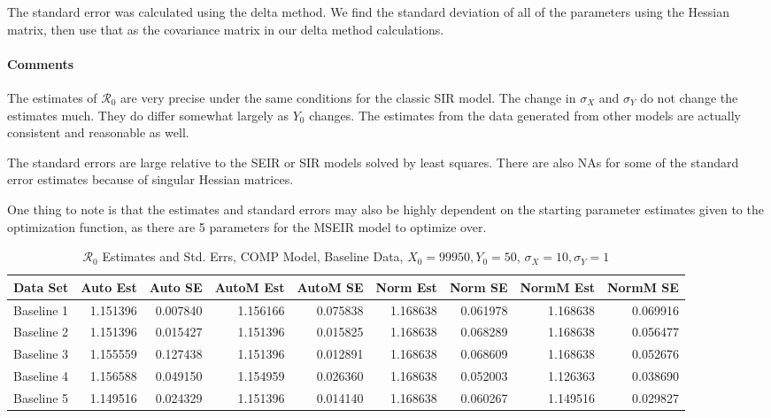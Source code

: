 \documentclass[12pt]{article}
\newcommand{\rr}{\ensuremath{\mathcal{R}_0}}
\begin{document}
The standard error was calculated using the delta method. We find the standard deviation of all of the parameters using the Hessian matrix, then use that as the covariance matrix in our delta method calculations.

\paragraph{Comments}

The estimates of $\rr$ are very precise under the same conditions for the classic SIR model. The change in $\sigma_X$ and $\sigma_Y$ do not change the estimates much. They do differ somewhat largely as $Y_0$ changes. The estimates from the data generated from other models are actually consistent and reasonable as well.

The standard errors are large relative to the SEIR or SIR models solved by least squares. There are also NAs for some of the standard error estimates because of singular Hessian matrices.

One thing to note is that the estimates and standard errors may also be highly dependent on the starting parameter estimates given to the optimization function, as there are 5 parameters for the MSEIR model to optimize over.

\begin{table}[H]
	
	\caption{$\rr$ Estimates and Std. Errs, COMP Model, 
		Baseline Data, $X_0 = 99950, Y_0 = 50$, 
		$\sigma_X = 10, \sigma_Y = 1$}
	\begin{footnotesize}
		\hskip -1cm
		\begin{tabular}{l|r|r|r|r|r|r|r|r}
			\hline
			Data Set & Auto Est & Auto SE & AutoM Est & AutoM SE & Norm Est & Norm SE & NormM Est & NormM SE\\
			\hline
			Baseline 1 & 1.151396 & 0.007840 & 1.156166 & 0.075838 & 1.168638 & 0.061978 & 1.168638 & 0.069916\\
			\hline
			Baseline 2 & 1.151396 & 0.015427 & 1.151396 & 0.015825 & 1.168638 & 0.068289 & 1.168638 & 0.056477\\
			\hline
			Baseline 3 & 1.155559 & 0.127438 & 1.151396 & 0.012891 & 1.168638 & 0.068609 & 1.168638 & 0.052676\\
			\hline
			Baseline 4 & 1.156588 & 0.049150 & 1.154959 & 0.026360 & 1.168638 & 0.052003 & 1.126363 & 0.038690\\
			\hline
			Baseline 5 & 1.149516 & 0.024329 & 1.151396 & 0.014140 & 1.168638 & 0.060267 & 1.149516 & 0.029827\\
			\hline
		\end{tabular}
	\end{footnotesize}
\end{table}
\end{document}
